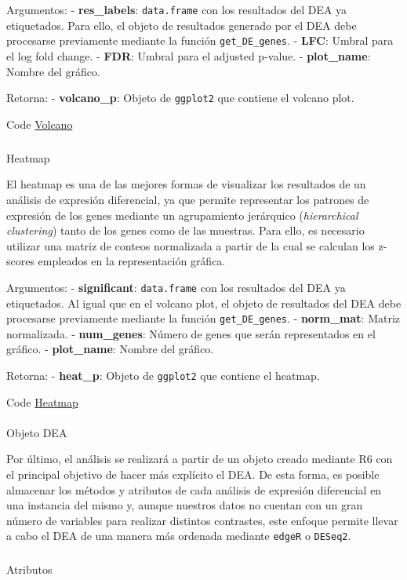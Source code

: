 \documentclass[
  9pt,
]{article}
\makeatletter
\let\oldparagraph\paragraph
\renewcommand{\paragraph}{
    \@ifstar
      \xxxParagraphStar
      \xxxParagraphNoStar
  }
\newcommand{\xxxParagraphStar}[1]{\oldparagraph*{#1}\mbox{}}
\newcommand{\xxxParagraphNoStar}[1]{\oldparagraph{#1}\mbox{}}
\let\oldsubparagraph\subparagraph
\renewcommand{\subparagraph}{
    \@ifstar
      \xxxSubParagraphStar
      \xxxSubParagraphNoStar
  }
\newcommand{\xxxSubParagraphStar}[1]{\oldsubparagraph*{#1}\mbox{}}
\newcommand{\xxxSubParagraphNoStar}[1]{\oldsubparagraph{#1}\mbox{}}
\makeatother
\begin{document}
Argumentos: - \textbf{res\_labels}: \texttt{data.frame} con los
resultados del DEA ya etiquetados. Para ello, el objeto de resultados
generado por el DEA debe procesarse previamente mediante la función
\texttt{get\_DE\_genes}. - \textbf{LFC}: Umbral para el log fold change.
- \textbf{FDR}: Umbral para el adjusted p-value. - \textbf{plot\_name}:
Nombre del gráfico.

Retorna: - \textbf{volcano\_p}: Objeto de \texttt{ggplot2} que contiene
el volcano plot.

Code \hyperref[plot_volcano]{Volcano}

\subparagraph{Heatmap}\label{heatmap}

El heatmap es una de las mejores formas de visualizar los resultados de
un análisis de expresión diferencial, ya que permite representar los
patrones de expresión de los genes mediante un agrupamiento jerárquico
(\emph{hierarchical clustering}) tanto de los genes como de las
muestras. Para ello, es necesario utilizar una matriz de conteos
normalizada a partir de la cual se calculan los z-scores empleados en la
representación gráfica.

Argumentos: - \textbf{significant}: \texttt{data.frame} con los
resultados del DEA ya etiquetados. Al igual que en el volcano plot, el
objeto de resultados del DEA debe procesarse previamente mediante la
función \texttt{get\_DE\_genes}. - \textbf{norm\_mat}: Matriz
normalizada. - \textbf{num\_genes}: Número de genes que serán
representados en el gráfico. - \textbf{plot\_name}: Nombre del gráfico.

Retorna: - \textbf{heat\_p}: Objeto de \texttt{ggplot2} que contiene el
heatmap.

Code \hyperref[plot_Heatmap]{Heatmap}

\paragraph{Objeto DEA}\label{objeto-dea}

Por último, el análisis se realizará a partir de un objeto creado
mediante R6 con el principal objetivo de hacer más explícito el DEA. De
esta forma, es posible almacenar los métodos y atributos de cada
análisis de expresión diferencial en una instancia del mismo y, aunque
nuestros datos no cuentan con un gran número de variables para realizar
distintos contrastes, este enfoque permite llevar a cabo el DEA de una
manera más ordenada mediante \texttt{edgeR} o \texttt{DESeq2}.

\subparagraph{Atributos}\label{atributos}
\end{document}
